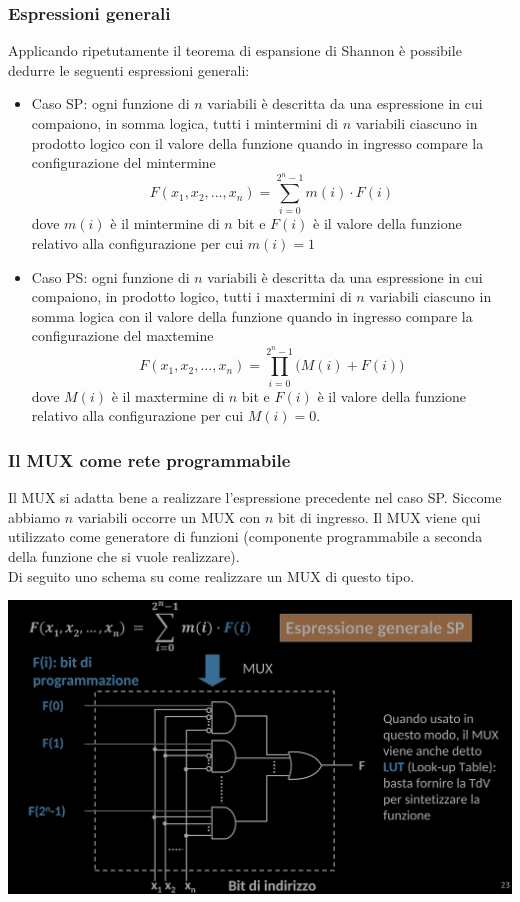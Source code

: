 \documentclass{article}
\begin{document}
\subsubsection{Espressioni generali}
Applicando ripetutamente il teorema di espansione di Shannon è possibile dedurre le seguenti espressioni generali:
\begin{itemize}
    \item Caso SP: ogni funzione di $n$ variabili è descritta da una espressione in cui compaiono, in somma logica, tutti i mintermini di $n$ variabili ciascuno in prodotto logico con il valore della funzione quando in ingresso compare la configurazione del mintermine
    $$ F(x_1,x_2,...,x_n) = \sum^{2^n -1}_{i=0} m(i) \cdot F(i) $$
    dove $m(i)$ è il mintermine di $n$ bit e $F(i)$ è il valore della funzione relativo alla configurazione per cui $m(i) = 1$
    \item Caso PS: ogni funzione di $n$ variabili è descritta da una espressione in cui compaiono, in prodotto logico, tutti i maxtermini di $n$ variabili ciascuno in somma logica con il valore della funzione quando in ingresso compare la configurazione del maxtemine
    $$ F(x_1,x_2,...,x_n) = \prod_{i=0}^{2^n -1} \big( M(i) + F(i) \big)$$
    dove $M(i)$ è il maxtermine di $n$ bit e $F(i)$ è il valore della funzione relativo alla configurazione per cui $M(i)=0$.
\end{itemize}
\subsubsection{Il MUX come rete programmabile}
Il MUX si adatta bene a realizzare l’espressione precedente nel caso SP. Siccome abbiamo $n$ variabili occorre un MUX con $n$ bit di ingresso. Il MUX viene qui utilizzato come generatore di funzioni (componente programmabile a seconda della funzione che si vuole realizzare).
\vspace{0.2cm}\\
Di seguito uno schema su come realizzare un MUX di questo tipo.
\begin{center}
    \includegraphics[scale=0.35]{ProgMUX.png}
\end{center}
\end{document}
